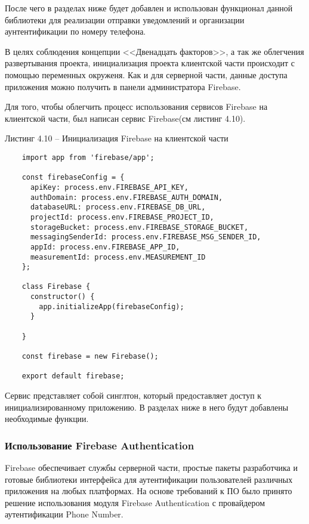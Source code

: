 После чего в разделах ниже будет добавлен и использован функционал данной библиотеки для реализации отправки уведомлений и организации аунтентификации по номеру телефона.


В целях соблюдения концепции <<Двенадцать факторов>>, а так же облегчения развертывания проекта, инициализация проекта клиентской части происходит с помощью переменных окруженя.
Как и для серверной части, данные доступа приложения можно получить в панели администратора Firebase.

Для того, чтобы облегчить процесс использования сервисов Firebase на клиентской части, был написан сервис Firebase(см листинг 4.10).

Листинг 4.10 – Инициализация Firebase на клиентской части
\begin{lstlisting}
    import app from 'firebase/app';

    const firebaseConfig = {
      apiKey: process.env.FIREBASE_API_KEY,
      authDomain: process.env.FIREBASE_AUTH_DOMAIN,
      databaseURL: process.env.FIREBASE_DB_URL,
      projectId: process.env.FIREBASE_PROJECT_ID,
      storageBucket: process.env.FIREBASE_STORAGE_BUCKET,
      messagingSenderId: process.env.FIREBASE_MSG_SENDER_ID,
      appId: process.env.FIREBASE_APP_ID,
      measurementId: process.env.MEASUREMENT_ID
    };

    class Firebase {
      constructor() {
        app.initializeApp(firebaseConfig);
      }

    }

    const firebase = new Firebase();

    export default firebase;

\end{lstlisting}

Сервис представляет собой синглтон, который предоставляет доступ к инициализированному приложению.
В разделах ниже в него будут добавлены необходимые функции.

\subsubsection{Использование Firebase Authentication}\hfill

Firebase обеспечивает службы серверной части, простые пакеты разработчика и готовые библиотеки интерфейса для аутентификации пользователей различных приложения на любых платформах.
На основе требований к ПО было принято решение использования модуля Firebase Authentication с провайдером аутентификации Phone Number.

